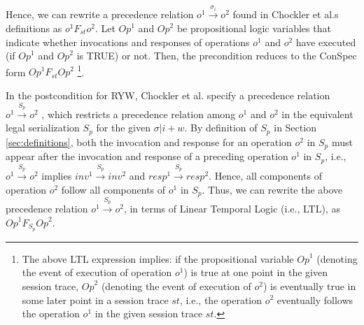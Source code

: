 \documentclass[journal,compsoc]{IEEEtran}
\begin{document}
 Hence, we can rewrite a precedence relation $ \mathit{o}^1 \xrightarrow{\sigma_i} \mathit{o}^2 $ found in Chockler et al.\textquotesingle s definitions as $\mathit{o}^1 F_\mathit{st} \mathit{o}^2$. %
 Let $\mathit{Op}^1$ and $\mathit{Op}^2$  be propositional logic
  variables that indicate whether invocations and responses of operations $\mathit{o}^1$ and $\mathit{o}^2$  have
  executed (if $\mathit{Op}^1$ and $\mathit{Op}^2$ is TRUE) or not.  Then, the precondition reduces to 
    the ConSpec form $\mathit{Op}^1 F_\mathit{st} \mathit{Op}^2 $ \footnote{The above LTL expression implies: if the propositional variable
    $\mathit{Op}^1$ (denoting the event of execution of operation $\mathit{o}^1$) is true at one point in the given session trace, $\mathit{Op}^2$ (denoting the event of execution of $\mathit{o}^2$)  is eventually true in some later point in a session trace $\mathit{st}$, i.e.,  the operation $\mathit{o}^2$ eventually follows the operation $\mathit{o}^1$ in the
     given session trace $\mathit{st}$. }.  %
 \par In the postcondition for RYW, Chockler et al.  specify a precedence relation $\mathit{o}^1 \xrightarrow{S_p} \mathit{o}^2$ , which  restricts a precedence relation among $\mathit{o}^1$ and $\mathit{o}^2$ in the equivalent legal serialization ${S_p}$ for the given $\sigma |i + w$.   By definition of $S_p$ in Section \ref{sec:definitions}, both the invocation and response for  an operation $\mathit{o}^2$ in $S_p$ must appear after the invocation and response of a preceding operation $\mathit{o}^1$ in $S_p$, i.e., $ \mathit{o}^1 \xrightarrow{S_p} \mathit{o}^2 $ implies $ \mathit{inv}^1 \xrightarrow{S_p} \mathit{inv}^2 $ and $ \mathit{resp}^1 \xrightarrow{S_p} \mathit{resp}^2 $.  
    Hence, all components of operation $\mathit{o}^2$ follow all components of $\mathit{o}^1$ in $S_p$. Thus, we can rewrite the above precedence relation 
  $ \mathit{o}^1 \xrightarrow{S_p} \mathit{o}^2 $, in terms of Linear Temporal Logic (i.e., LTL), as 
  $\mathit{Op}^1 F_{S_p} \mathit{Op}^2$. %
\end{document}
